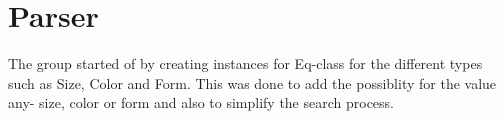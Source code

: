 \section*{Parser}
The group started of by creating instances for Eq-class for the different types
such as Size, Color and Form. This was done to add the possiblity for the value
any- size, color or form and also to simplify the search process.
